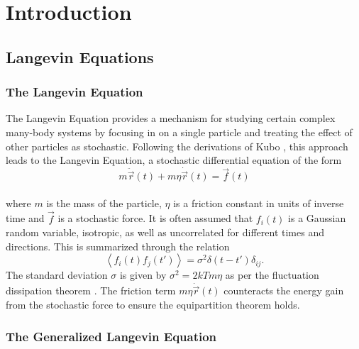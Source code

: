 \chapter{Introduction}

\section{Langevin Equations}

\subsection{The Langevin Equation} \label{sec:langevin_equation}

The Langevin Equation provides a mechanism for studying certain complex many-body systems by focusing in on a single particle and treating the effect of other particles as stochastic. Following the derivations of Kubo \cite{Kubo}, this approach leads to the Langevin Equation, a stochastic differential equation of the form 
\\
$$
m\ddot{\vec{r}}(t) + m \eta \dot{\vec{r}}(t) = \vec{f}(t)
$$
\\
where $m$ is the mass of the particle, $\eta$ is a friction constant in units of inverse time and $\vec{f}$ is a stochastic force. It is often assumed that $f_i(t)$ is a Gaussian random variable, isotropic, as well as uncorrelated for different times and directions. This is summarized through the relation 
\begin{equation}
\left<f_i(t)f_j(t')\right>=\sigma^2\delta(t-t')\delta_{ij} \label{eq:tdomain_corr}.
\end{equation}
The standard deviation $\sigma$ is given by $\sigma^2=2kTm\eta$ as per the fluctuation dissipation theorem \cite{Kubo}. The friction term $m \eta \dot{\vec{r}}(t)$ counteracts the energy gain from the stochastic force to ensure the equipartition theorem holds. 

\subsection{The Generalized Langevin Equation}

